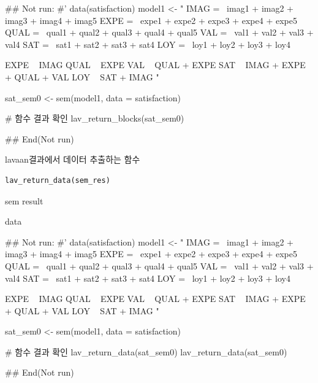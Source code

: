 \documentclass[a4paper]{book}
\begin{document}
%
\begin{Examples}
\begin{ExampleCode}

\#\# Not run: 
#'
data(satisfaction)
model1 <- "
IMAG =~ imag1 + imag2 + imag3 + imag4 + imag5
EXPE =~ expe1 + expe2 + expe3 + expe4 + expe5
QUAL =~ qual1 + qual2 + qual3 + qual4 + qual5
VAL =~ val1 + val2 + val3 + val4
SAT =~ sat1 + sat2 + sat3 + sat4
LOY =~ loy1 + loy2 + loy3 + loy4

EXPE ~ IMAG
QUAL ~ EXPE
VAL ~  QUAL + EXPE
SAT ~ IMAG + EXPE + QUAL + VAL
LOY ~ SAT + IMAG
"

sat_sem0 <- sem(model1, data = satisfaction)

# 함수 결과 확인
lav_return_blocks(sat_sem0)

## End(Not run)

\end{ExampleCode}
\end{Examples}
%
\begin{Description}
lavaan결과에서 데이터 추출하는 함수
\end{Description}
%
\begin{Usage}
\begin{verbatim}
lav_return_data(sem_res)
\end{verbatim}
\end{Usage}
%
\begin{Arguments}
\begin{ldescription}
\item[\code{sem\_res}] sem result
\end{ldescription}
\end{Arguments}
%
\begin{Value}
data
\end{Value}
%
\begin{Examples}
\begin{ExampleCode}

\#\# Not run: 
#'
data(satisfaction)
model1 <- "
IMAG =~ imag1 + imag2 + imag3 + imag4 + imag5
EXPE =~ expe1 + expe2 + expe3 + expe4 + expe5
QUAL =~ qual1 + qual2 + qual3 + qual4 + qual5
VAL =~ val1 + val2 + val3 + val4
SAT =~ sat1 + sat2 + sat3 + sat4
LOY =~ loy1 + loy2 + loy3 + loy4

EXPE ~ IMAG
QUAL ~ EXPE
VAL ~  QUAL + EXPE
SAT ~ IMAG + EXPE + QUAL + VAL
LOY ~ SAT + IMAG
"

sat_sem0 <- sem(model1, data = satisfaction)

# 함수 결과 확인
lav_return_data(sat_sem0)
lav_return_data(sat_sem0)%

## End(Not run)


\end{ExampleCode}
\end{Examples}
\end{document}

